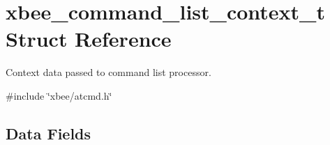 \hypertarget{structxbee__command__list__context__t}{\section{xbee\-\_\-command\-\_\-list\-\_\-context\-\_\-t Struct Reference}
\label{structxbee__command__list__context__t}
}


Context data passed to command list processor.  




{\ttfamily \#include \char`\"{}xbee/atcmd.\-h\char`\"{}}

\subsection*{Data Fields}
